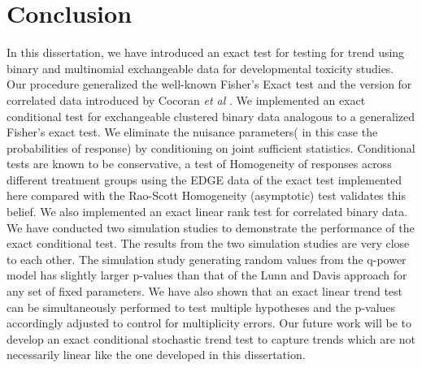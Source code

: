 \documentclass[12pt,oneside]{report}
\theoremstyle{definition}
\theoremstyle{mystyle}
\begin{document}
\section{Conclusion}
In this dissertation, we have introduced an exact test for testing for trend using binary and multinomial exchangeable data for developmental toxicity studies. Our procedure generalized the well-known Fisher's Exact test and the version for correlated data introduced by Cocoran \textit{et al} \cite{cocoran}. We implemented an exact conditional test for exchangeable clustered binary data analogous to a generalized Fisher's exact test. We eliminate the nuisance parameters( in this case  the probabilities of response) by conditioning on joint sufficient statistics. Conditional tests are known to be conservative, a test of Homogeneity of responses across different treatment groups using the EDGE data of the exact test implemented here compared  with the Rao-Scott Homogeneity (asymptotic) test validates this belief. We also implemented an exact linear rank test for correlated binary data. We have conducted two simulation studies to demonstrate the performance of the exact conditional test. The results from the two simulation studies are very close to each other. The simulation study generating random values from the q-power model has slightly larger p-values than that of the Lunn and Davis approach for any set of fixed parameters. We have also shown that an exact linear trend test can be simultaneously performed  to test multiple hypotheses and the p-values accordingly adjusted to control for multiplicity errors. Our future work will be to develop an exact conditional stochastic trend test to capture trends which are  not necessarily linear like the one   developed in this dissertation. 
\end{document}
